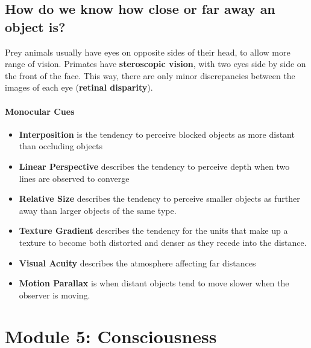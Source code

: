 \documentclass[10pt,letter]{article}
\theoremstyle{plain}
\theoremstyle{definition}
\begin{document}
\subsection*{How do we know how close or far away an object is?}
Prey animals usually have eyes on opposite sides of their head, to allow more range of vision. Primates have \textbf{steroscopic vision}, with two eyes side by side on the front of the face. This way, there are only minor discrepancies between the images of each eye (\textbf{retinal disparity}). 
\paragraph{Monocular Cues}
\begin{itemize}
    \item \textbf{Interposition} is the tendency to perceive blocked objects as more distant than occluding objects 
    \item \textbf{Linear Perspective} describes the tendency to perceive depth when two lines are observed to converge 
    \item \textbf{Relative Size} describes the tendency to perceive smaller objects as further away than larger objects of the same type. 
    \item \textbf{Texture Gradient} describes the tendency for the units that make up a texture to become both distorted and denser as they recede into the distance. 
    \item \textbf{Visual Acuity} describes the atmosphere affecting far distances 
    \item \textbf{Motion Parallax} is when distant objects tend to move slower when the observer is moving. 
\end{itemize}



\section*{Module 5: Consciousness}
\end{document}
